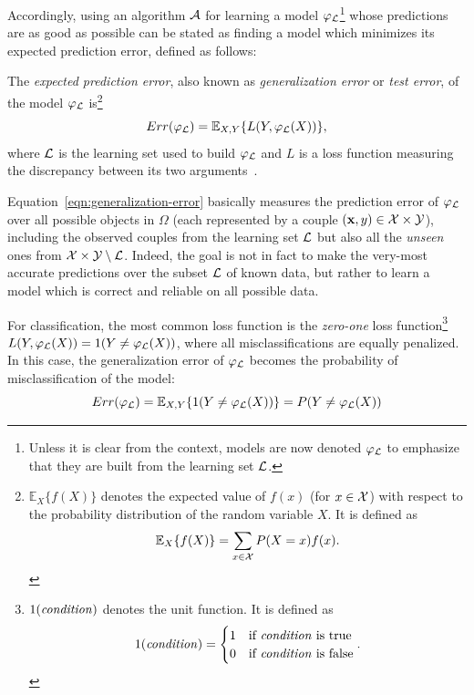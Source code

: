 Accordingly, using an algorithm ${\cal A}$ for learning a model $\varphi_{\cal
L}$\footnote{Unless it is clear from the context, models are now denoted
$\varphi_{\cal L}$ to emphasize that they are built from the learning set
${\cal L}$.} whose predictions are as good as possible can be stated as finding
a model which minimizes its expected prediction error, defined as follows:

\begin{definition}
The \emph{expected prediction error}, also known as \emph{generalization
error} or \emph{test error}, of the model $\varphi_{\cal L}$ is\footnote{$\mathbb{E}_X \{f(X)\}$ denotes the expected value of $f(x)$
(for $x \in {\cal X}$) with respect to the probability distribution of the
random variable $X$. It is defined as $$\mathbb{E}_X \{f(X)\} = \sum_{x \in {\cal
X}} P(X=x) f(x).$$}
\begin{equation}\label{eqn:generalization-error}
Err(\varphi_{\cal L}) = \mathbb{E}_{X, Y}\{ L(Y, \varphi_{\cal L}(X)) \},
\end{equation}
where ${\cal L}$ is the learning set used to build $\varphi_{\cal L}$ and $L$ is a loss
function measuring the discrepancy between its two
arguments~\citep{geurts:2002}.
\end{definition}

Equation~\ref{eqn:generalization-error} basically measures the prediction error
of $\varphi_{\cal L}$ over all possible objects in $\Omega$ (each represented by a couple
$(\mathbf{x}, y)\in {\cal X}\times{\cal Y}$), including the observed couples
from the learning set ${\cal L}$ but also all the \textit{unseen} ones from
${\cal X}\times{\cal Y} \setminus {\cal L}$. Indeed, the goal is not in fact to
make the very-most accurate predictions over the subset ${\cal L}$ of known
data, but rather to learn a model which is correct and reliable on all possible
data.

For classification, the most common loss function is the \textit{zero-one} loss
function\footnote{$1(\text{\textit{condition}})$ denotes the unit function. It
is defined as
$$1(\text{\textit{condition}}) =
\begin{cases}
1 & \text{if \textit{condition} is true}\\
0 & \text{if \textit{condition} is false}
\end{cases}.
$$} $L(Y, \varphi_{\cal L}(X)) = 1(Y \neq \varphi_{\cal L}(X))$, where all
misclassifications are equally penalized. In this case, the generalization
error of $\varphi_{\cal L}$ becomes the probability of misclassification of the model:
\begin{equation}
Err(\varphi_{\cal L}) = \mathbb{E}_{X, Y}\{ 1(Y \neq \varphi_{\cal L}(X)) \} = P(Y \neq \varphi_{\cal L}(X))
\end{equation}

